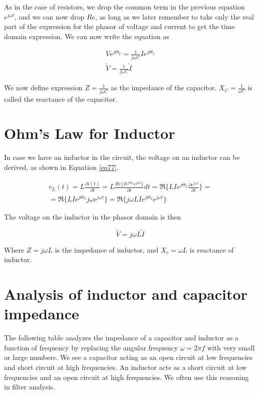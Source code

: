 \documentclass{ximera}
\begin{document}
As in the case of resistors, we drop the common term in the previous equation $ e^{j\omega t}$, and we can now drop $Re$, as long as we later remember to take only the real part of the expression for the phasor of voltage and current to get the time domain expression. We can now
write the equation as




\begin{eqnarray}
 V  e^{j \Theta_{V}}  =   \frac{1}{j \omega C}  I e^{j \Theta_I}  \\
 \tilde{V}  =  \frac{1}{j \omega C}  \tilde{I}
\end{eqnarray}

We now define expression $Z=\frac{1}{j \omega C} $ as the impedance of the capacitor. $X_C=\frac{1}{ \omega C}$ is called the reactance of the capacitor.


\section{Ohm's Law for Inductor}


In case we have an inductor in the circuit, the voltage on an inductor can be derived, as shown in Equation \ref{eq77}. 



\begin{eqnarray}
v_L(t) = L \frac{\partial{ i(t)}}{\partial t}  =L  \frac{ Re\{    I e^{j \Theta_I} e^{j \omega t}\}}{\partial t}  dt  = \Re\{  LI e^{j \Theta_I} \frac{ \partial e^{j \omega t}}{\partial t} \} =  \nonumber \\ = \Re\{  LI e^{j  \Theta_I}  j  \omega e^{j \omega t} \} =  \Re \{  j  \omega       LI e^{j  \Theta_I}    e^{j \omega t}   \}      \label{eq77} 
\end{eqnarray}

The voltage on the inductor in the phasor domain is then

\begin{equation}
\tilde{V}=j \omega L \tilde{I}
\end{equation}

Where $Z= j \omega L  $ is the impedance of inductor, and $X_c= \omega L $ is reactance of inductor.

\section{Analysis of inductor and capacitor impedance}

The following table analyzes the impedance of a capacitor and inductor as a function of frequency by replacing the angular frequency $\omega= 2 \pi f$ with very small or large numbers. We see a capacitor acting as an open circuit at low frequencies and short circuit at high frequencies. An inductor acts as a short circuit at low frequencies and an open circuit at high frequencies.  We often use this reasoning in filter analysis.
\end{document}

